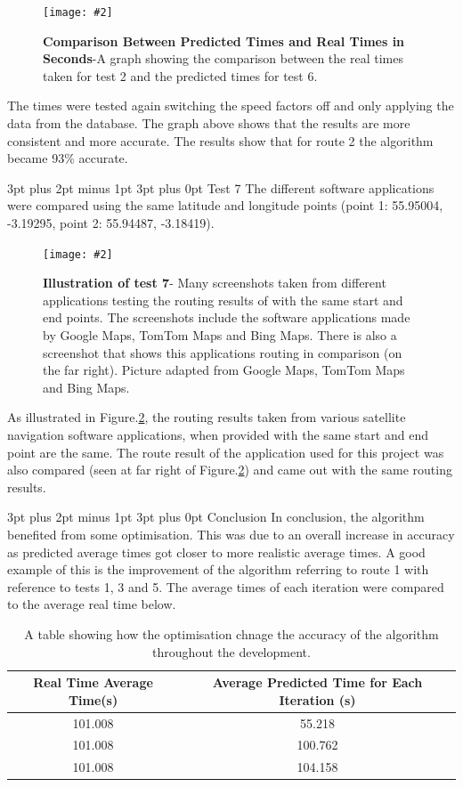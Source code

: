 \documentclass[12pt,a4paper]{article}
\makeatletter
\newcommand{\figuremacro}[5]{
    \begin{figure}[#1]
        \centering
        \texttt{[image: \#2]}
        \caption[#3]{\textbf{#3}#4}
        \label{fig:#2}
    \end{figure}
}
\renewcommand\subsection{\@startsection {subsection}{1}{0mm} %
                               {3pt plus 2pt minus 1pt} %
                               {3pt plus 0pt} %
                               {\normalfont\bfseries}}
\makeatother
\begin{document}
\figuremacro{h}{graph6}{Comparison Between Predicted Times and Real Times in Seconds}{-A graph showing the comparison between the real times taken for test 2 and the predicted times for test 6.}{0.8}

The times were tested again switching the speed factors off and only applying the data from the database. The graph above shows that the results are more consistent and more accurate. The results show that for route 2 the algorithm became 93\% accurate.



\subsection{Test 7}
The different software applications were compared using the same latitude and longitude points (point 1: 55.95004, -3.19295, point 2: 55.94487, -3.18419).

\figuremacro{h}{edzroutecombined}{Illustration of test 7}{- Many screenshots taken from different applications testing the routing results of with the same start and end points. The screenshots include the software applications made by Google Maps, TomTom Maps and Bing Maps. There is also a screenshot that shows this applications routing in comparison (on the far right). Picture adapted from Google Maps, TomTom Maps and Bing Maps.}{0.9} 

As illustrated in Figure.\ref{fig:edzroutecombined}, the routing results taken from various satellite navigation software applications, when provided with the same start and end point are the same. The route result of the application used for this project was also compared (seen at far right of Figure.\ref{fig:edzroutecombined}) and came out with the same routing results.

\subsection{Conclusion}
In conclusion, the algorithm benefited from some optimisation. This was due to an overall increase in accuracy as predicted average times got closer to more realistic average times. A good example of this is the improvement of the algorithm referring to route 1 with reference to tests 1, 3 and 5. The average times of each iteration were compared to the average real time below.

\begin{table}[h]
	\caption{A table showing how the optimisation chnage the accuracy of the algorithm throughout the development.}
	\begin{tabular}{@{}cc@{}}
		\toprule
		Real Time Average Time(s) & Average Predicted Time for Each Iteration (s) \\ \midrule
		101.008                   & 55.218                                        \\
		101.008                   & 100.762                                       \\
		101.008                   & 104.158                                       \\ \bottomrule
	\end{tabular}
\end{table}
\end{document}
